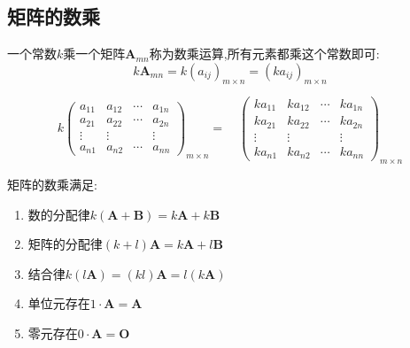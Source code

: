 \subsection{矩阵的数乘}
\begin{formal}
\begin{definition}[数乘]\label{def:数乘}
一个常数$k$乘一个矩阵$ 
\bm{A}_{mn}$称为数乘运算,所有元素都乘这个常数即可:
\[
    k\bm{A}_{mn} = k\left(a_{ij}\right)_{m \times n}
     =\left(k a_{ij}\right)_{m \times n}
\]
\vfill

\[  
    k \begin{pmatrix}
        a_{11}  &a_{12}&\cdots&a_{1n}\\
         a_{21} &a_{22}&\cdots&a_{2n}\\
            \vdots&\vdots&&\vdots\\
            a_{n1}&a_{n2}&\cdots&a_{nn}
    \end{pmatrix}_{m \times n}
    = \quad
     \begin{pmatrix}
        ka_{11}  & ka_{12} &\cdots & ka_{1n} \\
         ka_{21} & ka_{22} & \cdots & ka_{2n}\\
            \vdots&\vdots&&\vdots\\
            ka_{n1}&ka_{n2}&\cdots&ka_{nn}
    \end{pmatrix}_{m \times n}
\]
\end{definition}
\end{formal}
\begin{formal}
\begin{proposition}[数乘性质]\label{prop:数乘性质}
矩阵的数乘满足:
\begin{enumerate}[label=\textup{(\arabic*)}]
   \item 数的分配律$k \left(\bm{A} + \bm{B}\right) = k\bm{A} + k\bm{B}$
   \item 矩阵的分配律$\left(k + l\right)\bm{A} = k\bm{A} + l \bm{B}$
   \item 结合律$k\left(l\bm{A}\right) = 
   \left(kl\right) \bm{A} = 
   l \left(k\bm{A}\right)$
    \item 单位元存在$1\cdot\bm{A} = \bm{A}$
    \item 零元存在$0\cdot\bm{A} = \bm{O}$
\end{enumerate}
\end{proposition}
\end{formal}
